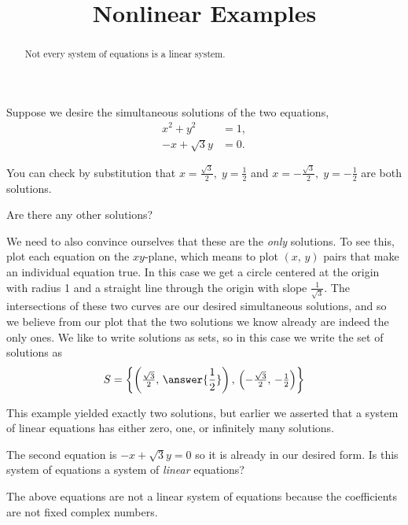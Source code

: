 \documentclass{ximera}
\title{Nonlinear Examples}
\begin{document}
\begin{abstract}
  Not every system of equations is a linear system.
\end{abstract}
\maketitle

\begin{example}
  Suppose we desire the simultaneous solutions of the two equations,
  \begin{align*}
    x^2+y^2&=1,\\
    -x+\sqrt{3}y&=0.
  \end{align*}
  
  You can check by substitution that $x=\tfrac{\sqrt{3}}{2},\;y=\tfrac{1}{2}$ and $x=-\tfrac{\sqrt{3}}{2},\;y=-\tfrac{1}{2}$ are both solutions.

  \begin{question}
    Are there any other solutions?
    \begin{multipleChoice}
    \end{multipleChoice}
  \end{question}
    
  \begin{question}
    We need to also convince ourselves that these are the
    \textit{only} solutions.  To see this, plot each equation on the
    $xy$-plane, which means to plot $(x,\,y)$ pairs that make an
    individual equation true.  In this case we get a circle centered
    at the origin with radius 1 and a straight line through the origin
    with slope $\tfrac{1}{\sqrt{3}}$.  The intersections of these two
    curves are our desired simultaneous solutions, and so we believe
    from our plot that the two solutions we know already are indeed
    the only ones.  We like to write solutions as sets, so in this
    case we write the set of solutions as
    \[
      S=\set{\left(\tfrac{\sqrt{3}}{2},\,\answer{\frac{1}{2}}\right),\,\left(-\tfrac{\sqrt{3}}{2},\,-\tfrac{1}{2}\right)}
    \]
  \end{question}

  \begin{question}
    This example yielded exactly two solutions, but earlier we asserted that a system of linear equations has either zero, one, or infinitely many solutions.

    The second equation is $-x+\sqrt{3}y=0$ so it is already in our desired form.  Is this system of equations a system of \textit{linear} equations?
    \begin{multipleChoice}
      \choice[Yes: we can write the first equation as $x \cdot x + y \cdot y = 1$.}
      \choice{correct}[No.]
    \end{multipleChoice}

    \begin{feedback}
      The above equations are not a linear system of equations because the coefficients are not fixed complex numbers.
    \end{feedback}
  \end{question}
\end{example}
\end{document}
